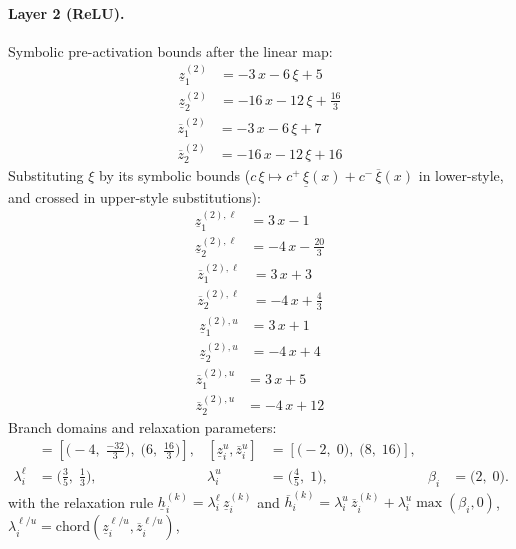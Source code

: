 \documentclass[11pt]{article}
\begin{document}
\paragraph{Layer 2 (ReLU).}
Symbolic pre-activation bounds after the linear map:
\begin{align*}
\underline{z}^{(2)}_{1} &= -3\,x - 6\,\xi + 5 \\
\underline{z}^{(2)}_{2} &= -16\,x - 12\,\xi + \frac{16}{3}
\end{align*}
\begin{align*}
\overline{z}^{(2)}_{1} &= -3\,x - 6\,\xi + 7 \\
\overline{z}^{(2)}_{2} &= -16\,x - 12\,\xi + 16
\end{align*}
Substituting $\xi$ by its symbolic bounds ($c\,\xi \mapsto c^{+}\,\underline{\xi}(x) + c^{-}\,\overline{\xi}(x)$ in lower-style, and crossed in upper-style substitutions):
\begin{align*}
\underline{z}^{(2),\ell}_{1} &= 3\,x - 1 \\
\underline{z}^{(2),\ell}_{2} &= -4\,x - \frac{20}{3}
\end{align*}
\begin{align*}
\overline{z}^{(2),\ell}_{1} &= 3\,x + 3 \\
\overline{z}^{(2),\ell}_{2} &= -4\,x + \frac{4}{3}
\end{align*}
\begin{align*}
\underline{z}^{(2),u}_{1} &= 3\,x + 1 \\
\underline{z}^{(2),u}_{2} &= -4\,x + 4
\end{align*}
\begin{align*}
\overline{z}^{(2),u}_{1} &= 3\,x + 5 \\
\overline{z}^{(2),u}_{2} &= -4\,x + 12
\end{align*}
Branch domains and relaxation parameters:
\begin{align*}
[\underline{z}^{\ell}_i, \overline{z}^{\ell}_i] &= [\bigl(-4,\; \frac{-32}{3}\bigr),\; \bigl(6,\; \frac{16}{3}\bigr)], & [\underline{z}^{u}_i, \overline{z}^{u}_i] &= [\bigl(-2,\; 0\bigr),\; \bigl(8,\; 16\bigr)], \\
\lambda^{\ell}_i &= \bigl(\frac{3}{5},\; \frac{1}{3}\bigr), & \lambda^{u}_i &= \bigl(\frac{4}{5},\; 1\bigr), & \beta_i &= \bigl(2,\; 0\bigr).
\end{align*}
with the relaxation rule
$\underline{h}^{(k)}_i = \lambda^{\ell}_i\, \underline{z}^{(k)}_i$ and
$\overline{h}^{(k)}_i = \lambda^{u}_i\, \overline{z}^{(k)}_i + \lambda^{u}_i \max(\beta_i, 0)$,
$\lambda^{\ell/u}_i = \mathrm{chord}(\underline{z}_i^{\ell/u}, \overline{z}_i^{\ell/u})$,
\end{document}
